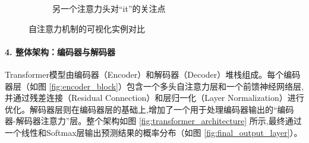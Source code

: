 \begin{figure}[H]
\begin{subfigure}[b]{0.48\textwidth}
        \caption{另一个注意力头对“it”的关注点}
        \label{fig:self_attention_it_2}
    \end{subfigure}
    \caption{自注意力机制的可视化实例对比}
    \label{fig:self_attention_example}
\end{figure}

\paragraph{4. 整体架构：编码器与解码器}
Transformer模型由编码器（Encoder）和解码器（Decoder）堆栈组成。每个编码器层（如图 \ref{fig:encoder_block}）包含一个多头自注意力层和一个前馈神经网络层,并通过残差连接（Residual Connection）和层归一化（Layer Normalization）进行优化。解码器层则在编码器层的基础上,增加了一个用于处理编码器输出的“编码器-解码器注意力”层。整个架构如图 \ref{fig:transformer_architecture} 所示,最终通过一个线性和Softmax层输出预测结果的概率分布（如图 \ref{fig:final_output_layer}）。
